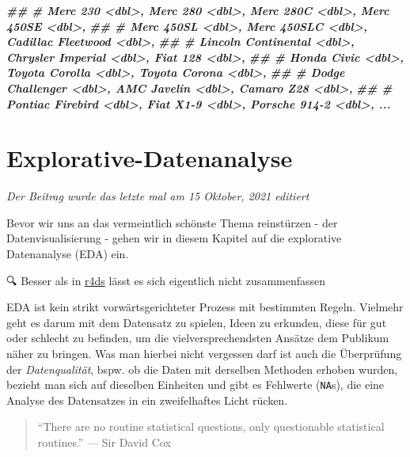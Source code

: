 \documentclass[
]{article}
\newenvironment{Shaded}{\begin{snugshade}}{\end{snugshade}}
\newcommand{\DocumentationTok}[1]{\textcolor[rgb]{0.56,0.35,0.01}{\textbf{\textit{#1}}}}
\begin{document}
\begin{Shaded}
\begin{Highlighting}[]
\DocumentationTok{\#\# \#   Merc 230 \textless{}dbl\textgreater{}, Merc 280 \textless{}dbl\textgreater{}, Merc 280C \textless{}dbl\textgreater{}, Merc 450SE \textless{}dbl\textgreater{},}
\DocumentationTok{\#\# \#   Merc 450SL \textless{}dbl\textgreater{}, Merc 450SLC \textless{}dbl\textgreater{}, Cadillac Fleetwood \textless{}dbl\textgreater{},}
\DocumentationTok{\#\# \#   Lincoln Continental \textless{}dbl\textgreater{}, Chrysler Imperial \textless{}dbl\textgreater{}, Fiat 128 \textless{}dbl\textgreater{},}
\DocumentationTok{\#\# \#   Honda Civic \textless{}dbl\textgreater{}, Toyota Corolla \textless{}dbl\textgreater{}, Toyota Corona \textless{}dbl\textgreater{},}
\DocumentationTok{\#\# \#   Dodge Challenger \textless{}dbl\textgreater{}, AMC Javelin \textless{}dbl\textgreater{}, Camaro Z28 \textless{}dbl\textgreater{},}
\DocumentationTok{\#\# \#   Pontiac Firebird \textless{}dbl\textgreater{}, Fiat X1{-}9 \textless{}dbl\textgreater{}, Porsche 914{-}2 \textless{}dbl\textgreater{}, ...}
\end{Highlighting}
\end{Shaded}

\hypertarget{explorative-datenanalyse}{%
\section{Explorative-Datenanalyse}\label{explorative-datenanalyse}}

\emph{Der Beitrag wurde das letzte mal am 15 Oktober, 2021 editiert}

Bevor wir uns an das vermeintlich schönste Thema reinstürzen - der Datenvisualisierung - gehen wir in diesem Kapitel auf die explorative Datenanalyse (EDA) ein.

🔍 Besser als in \href{https://r4ds.had.co.nz/exploratory-data-analysis.html}{r4ds} lässt es sich eigentlich nicht zusammenfassen

EDA ist kein strikt vorwärtsgerichteter Prozess mit bestimmten Regeln. Vielmehr geht es darum mit dem Datensatz zu spielen, Ideen zu erkunden, diese für gut oder schlecht zu befinden, um die vielversprechendsten Ansätze dem Publikum näher zu bringen. Was man hierbei nicht vergessen darf ist auch die Überprüfung der \emph{Datenqualität}, bspw. ob die Daten mit derselben Methoden erhoben wurden, bezieht man sich auf dieselben Einheiten und gibt es Fehlwerte (\texttt{NA}s), die eine Analyse des Datensatzes in ein zweifelhaftes Licht rücken.

\begin{quote}
``There are no routine statistical questions, only questionable statistical routines.'' --- Sir David Cox
\end{quote}
\end{document}
